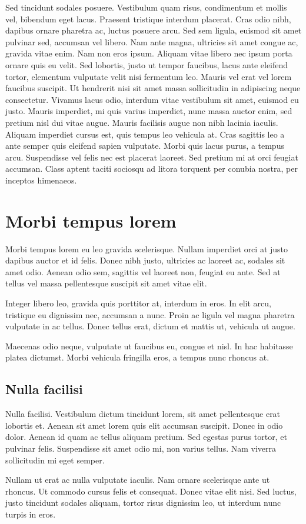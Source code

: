 \documentclass{elteikthesis}
\begin{document}
Sed tincidunt 
sodales posuere. Vestibulum quam risus, condimentum et mollis vel, bibendum
eget lacus. Praesent tristique interdum placerat. Cras odio nibh, dapibus 
ornare pharetra ac, luctus posuere arcu. Sed sem ligula, 
euismod sit amet pulvinar sed, accumsan vel libero. 
Nam ante magna, ultricies sit amet congue ac, gravida vitae enim. Nam non eros ipsum. Aliquam vitae libero nec ipsum porta ornare quis eu velit. Sed lobortis, justo ut tempor faucibus, lacus ante eleifend tortor, elementum vulputate velit nisi fermentum leo. Mauris vel erat vel lorem faucibus suscipit. Ut hendrerit nisi sit amet massa sollicitudin in adipiscing neque consectetur. Vivamus lacus odio, interdum vitae vestibulum sit amet, euismod eu justo. Mauris imperdiet, mi quis varius imperdiet, nunc massa auctor enim, sed pretium nisl dui vitae augue. Mauris facilisis augue non nibh lacinia iaculis. Aliquam imperdiet cursus est, quis tempus leo vehicula at. Cras sagittis leo a ante semper quis eleifend sapien vulputate. Morbi quis lacus purus, a tempus arcu. Suspendisse vel felis nec est placerat laoreet. Sed pretium mi at orci feugiat accumsan. Class aptent taciti sociosqu ad litora torquent per conubia nostra, per inceptos himenaeos.

\chapter{Morbi tempus lorem}
Morbi tempus lorem  eu leo gravida scelerisque. 
Nullam imperdiet orci at justo dapibus auctor et id felis. Donec nibh justo, 
ultricies ac laoreet ac, sodales sit amet odio. Aenean odio sem, sagittis vel 
laoreet non, feugiat eu ante. Sed at tellus vel massa pellentesque suscipit sit amet vitae elit. 

Integer libero leo, gravida quis porttitor at, interdum in eros. 
In elit arcu, tristique eu dignissim nec, accumsan a nunc. Proin ac ligula 
vel magna pharetra vulputate in ac tellus. Donec tellus erat, dictum et mattis ut, vehicula ut augue. 

Maecenas odio neque, vulputate ut faucibus eu, congue et nisl. In hac habitasse platea dictumst. 
Morbi vehicula fringilla eros, a tempus nunc rhoncus at. 

\section{Nulla facilisi}
Nulla facilisi. Vestibulum dictum tincidunt lorem, sit amet pellentesque erat lobortis et.
Aenean sit amet lorem quis elit accumsan suscipit. Donec in odio dolor. Aenean id quam ac 
tellus aliquam pretium. Sed egestas purus tortor, et pulvinar felis. Suspendisse sit amet 
odio mi, non varius tellus. Nam viverra sollicitudin mi eget semper. 

Nullam ut erat ac nulla vulputate iaculis. Nam ornare scelerisque ante ut rhoncus. 
Ut commodo cursus felis et consequat. Donec vitae elit nisi. Sed luctus, 
justo tincidunt sodales aliquam, tortor risus dignissim leo, ut interdum nunc turpis in eros. 
\end{document}
